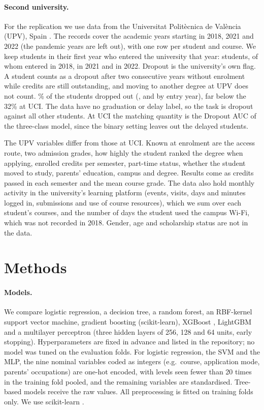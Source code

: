 \documentclass[11pt,a4paper]{article}
\begin{document}
\paragraph{Second university.} For the replication we use data from the Universitat Polit\`ecnica de Val\`encia (UPV), Spain \citep{igualde2025}. The records cover the academic years starting in 2018, 2021 and 2022 (the pandemic years are left out), with one row per student and course. We keep students in their first year who entered the university that year: \upvN{} students, of whom \upvNEighteen{} entered in 2018, \upvNTwentyone{} in 2021 and \upvNTwentytwo{} in 2022. Dropout is the university's own flag. A student counts as a dropout after two consecutive years without enrolment while credits are still outstanding, and moving to another degree at UPV does not count. \upvRatePct\% of the students dropped out (\upvRateEighteen, \upvRateTwentyone{} and \upvRateTwentytwo{} by entry year), far below the 32\% at UCI. The data have no graduation or delay label, so the task is dropout against all other students. At UCI the matching quantity is the Dropout AUC of the three-class model, since the binary setting leaves out the delayed students.

The UPV variables differ from those at UCI. Known at enrolment are the access route, two admission grades, how highly the student ranked the degree when applying, enrolled credits per semester, part-time status, whether the student moved to study, parents' education, campus and degree. Results come as credits passed in each semester and the mean course grade. The data also hold monthly activity in the university's learning platform (events, visits, days and minutes logged in, submissions and use of course resources), which we sum over each student's courses, and the number of days the student used the campus Wi-Fi, which was not recorded in 2018. Gender, age and scholarship status are not in the data.

\section{Methods}
\label{sec:methods}

\paragraph{Models.} We compare logistic regression, a decision tree, a random forest, an RBF-kernel support vector machine, gradient boosting (scikit-learn), XGBoost \citep{chen2016}, LightGBM \citep{ke2017} and a multilayer perceptron (three hidden layers of 256, 128 and 64 units, early stopping). Hyperparameters are fixed in advance and listed in the repository; no model was tuned on the evaluation folds. For logistic regression, the SVM and the MLP, the nine nominal variables coded as integers (e.g.\ course, application mode, parents' occupations) are one-hot encoded, with levels seen fewer than 20 times in the training fold pooled, and the remaining variables are standardised. Tree-based models receive the raw values. All preprocessing is fitted on training folds only. We use scikit-learn \citep{pedregosa2011}.
\end{document}
